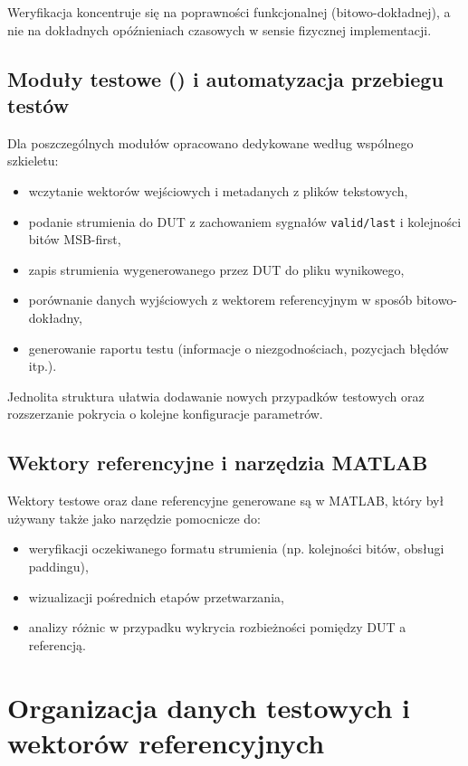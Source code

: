 Weryfikacja koncentruje się na poprawności funkcjonalnej (bitowo-dokładnej), a nie na dokładnych opóźnieniach czasowych w sensie fizycznej implementacji.

\subsection{Moduły testowe () i automatyzacja przebiegu testów}
Dla poszczególnych modułów opracowano dedykowane  według wspólnego szkieletu:
\begin{itemize}
    \item wczytanie wektorów wejściowych i metadanych z plików tekstowych,
    \item podanie strumienia do DUT z zachowaniem sygnałów \texttt{valid/last} i kolejności bitów MSB-first,
    \item zapis strumienia wygenerowanego przez DUT do pliku wynikowego,
    \item porównanie danych wyjściowych z wektorem referencyjnym w sposób bitowo-dokładny,
    \item generowanie raportu testu (informacje o niezgodnościach, pozycjach błędów itp.).
\end{itemize}

Jednolita struktura  ułatwia dodawanie nowych przypadków testowych oraz rozszerzanie pokrycia o kolejne konfiguracje parametrów.

\subsection{Wektory referencyjne i narzędzia MATLAB}
Wektory testowe oraz dane referencyjne generowane są w MATLAB, który był używany także jako narzędzie pomocnicze do:
\begin{itemize}
    \item weryfikacji oczekiwanego formatu strumienia (np. kolejności bitów, obsługi paddingu),
    \item wizualizacji pośrednich etapów przetwarzania,
    \item analizy różnic w przypadku wykrycia rozbieżności pomiędzy DUT a referencją.
\end{itemize}

\section{Organizacja danych testowych i wektorów referencyjnych}
\label{sec:organizacja_wektorow}

